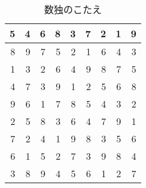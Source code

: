 \documentclass{jsarticle}
\begin{document}
\newpage
　
\vspace{25zw}
\begin{table}[htb]
	\captionsetup{labelformat=empty,labelsep=none}
	\caption{数独のこたえ}
	\centering
	\begin{tabular}{|r|r|r||r|r|r||r|r|r|}\hline
		5	&4	&6	&8	&3	&7	&2	&1	&9	\\ \hline
		8	&9	&7	&5	&2	&1	&6	&4	&3	\\ \hline
		1	&3	&2	&6	&4	&9	&8	&7	&5	\\ \hhline{|=|=|=#=|=|=#=|=|=|}
		4	&7	&3	&9	&1	&2	&5	&6	&8	\\ \hline
		9	&6	&1	&7	&8	&5	&4	&3	&2	\\ \hline
		2	&5	&8	&3	&6	&4	&7	&9	&1	\\ \hhline{|=|=|=#=|=|=#=|=|=|}
		7	&2	&4	&1	&9	&8	&3	&5	&6	\\ \hline
		6	&1	&5	&2	&7	&3	&9	&8	&4	\\ \hline
		3	&8	&9	&4	&5	&6	&1	&2	&7	\\ \hline
	\end{tabular}
\end{table}
\end{document}
